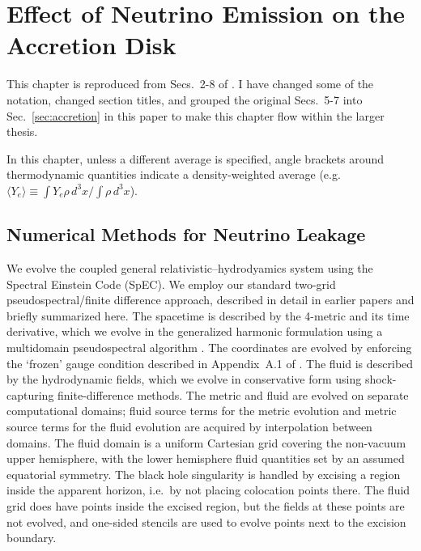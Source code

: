 \chapter{Effect of Neutrino Emission on the Accretion Disk}
\label{chap:leakage}

This chapter is reproduced from Secs.~2-8 of \citealt{deat2013-leakage}.
I have changed some of the notation, changed section titles, and grouped
the original Secs.~5-7 into Sec.~\ref{sec:accretion} in this paper to make this
chapter flow within the larger thesis.

In this chapter, unless a different average is specified, angle brackets around
thermodynamic quantities indicate a density-weighted average
(e.g.\ $\langle Y_e \rangle \equiv \int Y_e \rho\, d^3x/ \int \rho\, d^3x$).

\section{Numerical Methods for Neutrino Leakage}
\label{sec:Methods}

We evolve the coupled general relativistic--hydrodyamics system using
the Spectral Einstein Code (SpEC).
We employ our standard two-grid pseudospectral/finite difference approach,
described in detail in earlier papers
\citep{Scheel2006,Duez:2008rb,Hemberger:2012jz,Foucart:2013a}
and briefly summarized here. The spacetime is described by the 4-metric and
its time derivative, which we evolve in the generalized harmonic formulation using a multidomain
pseudospectral algorithm \citep{Lindblom:2007}.
The coordinates are evolved by enforcing the `frozen' gauge condition described
in Appendix~A.1 of \cite{Foucart:2013a}.
The fluid is described by the hydrodynamic fields,
which we evolve in conservative form using shock-capturing finite-difference
methods.  The metric and fluid are evolved on separate computational domains;
fluid source terms for the metric evolution and metric source terms for the
fluid evolution are acquired by interpolation between domains.  The fluid
domain is a uniform Cartesian grid covering the non-vacuum upper hemisphere,
with the lower hemisphere fluid quantities set by an assumed equatorial
symmetry. The black hole singularity is handled by excising
a region inside the apparent horizon, i.e.\ by not placing colocation points
there.  The fluid grid does have points inside the excised region, but the fields
at these points are not evolved, and one-sided stencils are used to evolve points next
to the excision boundary.

